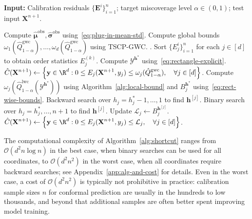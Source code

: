 \begin{algorithm}[!htbp]
\caption{Transductively Standardized Conformal Prediction (TSCP)}
\label{alg:shortcut}
\textbf{Input:} Calibration residuals $\{\mathbf{E}^i\}_{i=1}^{n}$; target miscoverage level $\alpha\in(0,1)$; test input $\mathbf{X}^{n+1}$.
\begin{algorithmic}[1]
\State Compute $\hat{\boldsymbol\mu}^{\mathrm{obs}}, \hat{\boldsymbol\sigma}^{\mathrm{obs}}$ using~\eqref{eq:plug-in-mean-std}.
\State Compute global bounds $\omega_1(\hat{Q}^{\mathrm{gwc}}_{1-\alpha}),\ldots,\omega_d(\hat{Q}^{\mathrm{gwc}}_{1-\alpha})$ using TSCP-GWC. .
\State Sort $\{{E}^i_j\}_{i=1}^n$ for each $j\in[d]$ to obtain order statistics $E^{(k)}_j$. 
\State Compute $\mathcal{Y}^{\mathbf{h}^*}$ using~\eqref{eq:rectangle-explicit}.
    \State \Return $\displaystyle \hat{C}(\mathbf{X}^{n+1}) 
    \gets \left\{\mathbf y \in \R^d: 0\leq E_j(\mathbf{X}^{n+1},y_j) \leq \omega_j(\hat{Q}^{\mathrm{gwc}}_{1-\alpha}), \quad\forall j \in [d]\right\}$.
\Else
        \State Compute $\omega_j(\hat{Q}^{\mathrm{lwc}}_{1-\alpha}(\mathcal{Y}^{\mathbf{h}^*}))$ using Algorithm~\ref{alg:local-bound} and $B^{\mathbf{h}^*}_j$ using~\eqref{eq:rect-wise-bounds}.
            \State Backward search over $h_j = h^*_j-1,\ldots, 1$ to find $\mathbf{h}^{[j]}$.\hfill
        \Else 
            \State Binary search over $h_j = h^*_j,\ldots, n{+}1$ to find $\mathbf{h}^{[j]}$.\hfill
        \EndIf
        \State Update $\mathcal{L}_j \gets B^{\mathbf{h}^{[j]}}_j$.
    \EndFor
    \State \Return $\displaystyle \hat{C}(\mathbf{X}^{n+1}) 
    \gets \left\{\mathbf y \in \R^d: 0\leq E_j(\mathbf{X}^{n+1},y_j) \leq \mathcal{L}_j, \quad\forall j \in [d]\right\}$.
\EndIf
\end{algorithmic}
\end{algorithm}

The computational complexity of Algorithm~\ref{alg:shortcut} ranges from $\mathcal{O}(d^2 n \log n)$ in the best case, when binary searches can be used for all coordinates, to $\mathcal{O}(d^2 n^2)$ in the worst case, when all coordinates require backward searches; see Appendix~\ref{app:alg-and-cost} for details. Even in the worst case, a cost of $\mathcal{O}(d^2 n^2)$ is typically not prohibitive in practice: calibration sample sizes $n$ for conformal prediction are usually in the hundreds to low thousands, and beyond that additional samples are often better spent improving model training.

